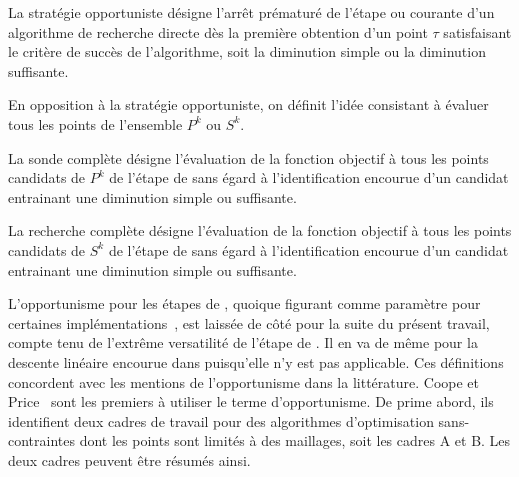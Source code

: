 \begin{definition}\label{def:ops}
La stratégie opportuniste désigne l'arrêt prématuré de l'étape \SEARCH ou \POLL courante d'un algorithme de recherche directe dès la première obtention d'un point $\tau$ satisfaisant le critère de succès de l'algorithme, soit la diminution simple ou la diminution suffisante.
\end{definition}
En opposition à la stratégie opportuniste, on définit l'idée consistant à évaluer tous les points de l'ensemble $P^k$ ou $S^k$.
\begin{definition}\label{def:completepoll}
La sonde complète désigne l'évaluation de la fonction objectif à tous les points candidats de $P^k$ de l'étape de \POLL sans égard à l'identification encourue d'un candidat entrainant une diminution simple ou suffisante. 

La recherche complète désigne l'évaluation de la fonction objectif à tous les points candidats de $S^k$ de l'étape de \SEARCH sans égard à l'identification encourue d'un candidat entrainant une diminution simple ou suffisante. 
\end{definition}
L'opportunisme pour les étapes de \SEARCH, quoique figurant comme paramètre pour certaines implémentations~\cite{Le09a}, est laissée de côté pour la suite du présent travail, compte tenu de l'extrême versatilité de l'étape de \SEARCH. Il en va de même pour la descente linéaire encourue dans \imfil puisqu'elle n'y est pas applicable. Ces définitions concordent avec les mentions de l'opportunisme dans la littérature. Coope et Price~\cite{CoPr01a} sont les premiers à utiliser le terme d'opportunisme. De prime abord, ils identifient deux cadres de travail pour des algorithmes d'optimisation sans-contraintes dont les points sont limités à des maillages, soit les cadres A et B. Les deux cadres peuvent être résumés ainsi.
